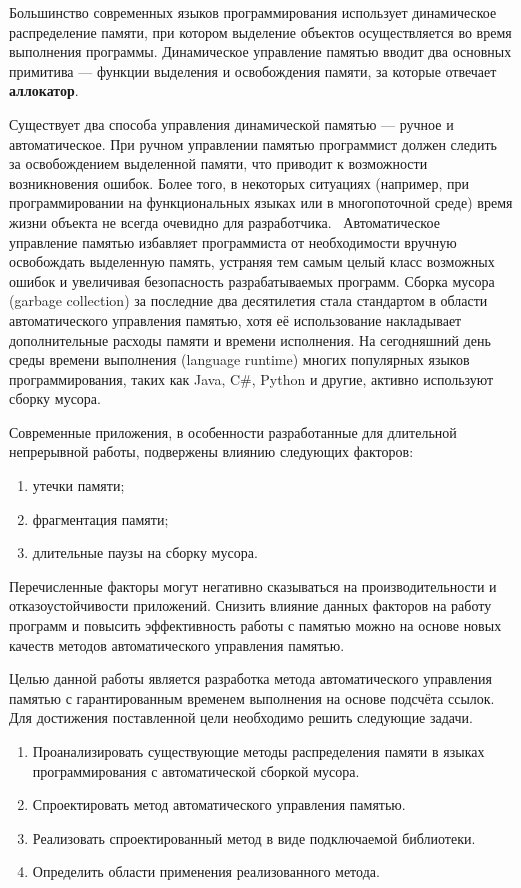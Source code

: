 Большинство современных языков программирования использует динамическое распределение памяти, при котором выделение объектов осуществляется во время выполнения программы. Динамическое управление памятью вводит два основных примитива --- функции выделения и освобождения памяти, за которые отвечает \textbf{аллокатор}. 

Существует два способа управления динамической памятью --- ручное и автоматическое. При ручном управлении памятью программист должен следить за освобождением выделенной памяти, что приводит к возможности возникновения ошибок. Более того, в некоторых ситуациях (например, при программировании на функциональных языках или в многопоточной среде) время жизни объекта не всегда очевидно для разработчика.~\cite{elixir} Автоматическое управление памятью избавляет программиста от необходимости вручную освобождать выделенную память, устраняя тем самым целый класс возможных ошибок и увеличивая безопасность разрабатываемых программ. Сборка мусора (garbage collection) за последние два десятилетия стала стандартом в области автоматического управления памятью, хотя её использование накладывает дополнительные расходы памяти и времени исполнения. На сегодняшний день среды времени выполнения (language runtime) многих популярных языков программирования, таких как Java, C\#, Python и другие, активно используют сборку мусора. 

Современные приложения, в особенности разработанные для длительной непрерывной работы, подвержены влиянию следующих факторов: 
\begin{enumerate}[label*=\arabic*)]
	\item утечки памяти;
	\item фрагментация памяти;
	\item длительные паузы на сборку мусора.
\end{enumerate}
Перечисленные факторы могут негативно сказываться на производительности и отказоустойчивости приложений. Снизить влияние данных факторов на работу программ и повысить эффективность работы с памятью можно на основе новых качеств методов автоматического управления памятью.

Целью данной работы является разработка метода автоматического управления памятью с гарантированным временем выполнения на основе подсчёта ссылок. Для достижения поставленной цели необходимо решить следующие задачи.

\begin{enumerate}[label*=\arabic*.]
	\item Проанализировать существующие методы распределения памяти в языках программирования с автоматической сборкой мусора.
	\item Спроектировать метод автоматического управления памятью.
	\item Реализовать спроектированный метод в виде подключаемой библиотеки.
	\item Определить области применения реализованного метода. 
\end{enumerate}
